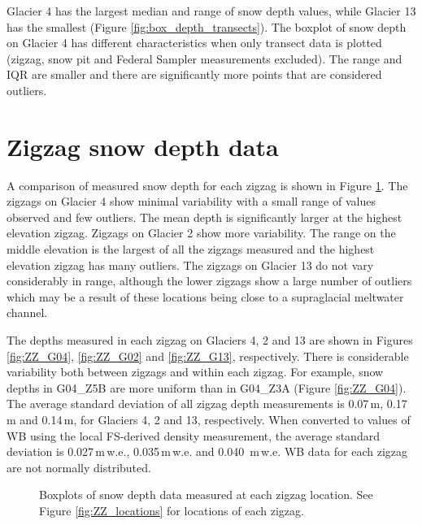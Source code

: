 \documentclass{sfuthesis}
\begin{document}
Glacier 4 has the largest median and range of snow depth values, while Glacier 13 has the smallest (Figure \ref{fig:box_depth_transects}). The boxplot of snow depth on Glacier 4 has different characteristics when only transect data is plotted (zigzag, snow pit and Federal Sampler measurements excluded). The range and IQR are smaller and there are significantly more points that are considered outliers. 

\section{Zigzag snow depth data}

A comparison of measured snow depth for each zigzag is shown in Figure \ref{fig:ZZ_boxplot}. The zigzags on Glacier 4 show minimal variability with a small range of values observed and few outliers. The mean depth is significantly larger at the highest elevation zigzag. Zigzags on Glacier 2 show more variability. The range on the middle elevation is the largest of all the zigzags measured and the highest elevation zigzag has many outliers. The zigzags on Glacier 13 do not vary considerably in range, although the lower zigzags show a large number of outliers which may be a result of these locations being close to a supraglacial meltwater channel. 

The depths measured in each zigzag on Glaciers 4, 2 and 13 are shown in Figures \ref{fig:ZZ_G04}, \ref{fig:ZZ_G02} and \ref{fig:ZZ_G13}, respectively. There is considerable variability both between zigzags and within each zigzag. For example, snow depths in G04\_Z5B are more uniform than in G04\_Z3A (Figure \ref{fig:ZZ_G04}). The average standard deviation of all zigzag depth measurements is 0.07\,m, 0.17\,m and 0.14\,m, for Glaciers 4, 2 and 13, respectively. When converted to values of WB using the local FS-derived density measurement, the average standard deviation is 0.027\,m\,w.e., 0.035\,m\,w.e. and 0.040 \,m\,w.e. WB data for each zigzag are not normally distributed.

\begin{figure}[H]
	\centering
	\caption{Boxplots of snow depth data measured at each zigzag location. See Figure \ref{fig:ZZ_locations} for locations of each zigzag.}
	\label{fig:ZZ_boxplot}
\end{figure}
\end{document}
